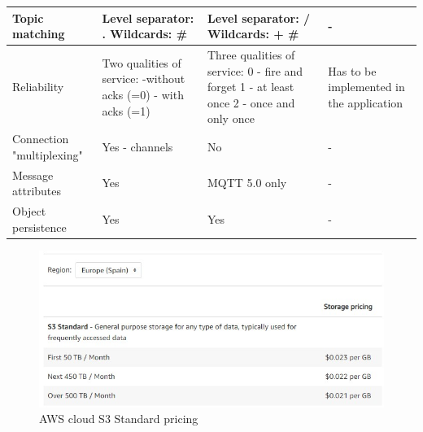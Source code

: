 \begin{table}[htbp]
\begin{center}
\begin{tabular}{|p{3cm}|p{4.5cm}|p{4.5cm}|p{4.5cm}|}
    \hline
    Topic matching & Level separator: . Wildcards: \* \# & Level separator: / Wildcards: + \# & - \\
    \hline
    Reliability & Two qualities of service: -without acks (=0) - with acks (=1) & Three qualities of service: 0 - fire and forget 1 - at least once 2 - once and only once & Has to be implemented in the application\\
    \hline
    Connection "multiplexing" & Yes - channels & No & -\\
    \hline
    Message attributes & Yes & MQTT 5.0 only & -\\
    \hline
    Object persistence & Yes & Yes & -\\
    \hline
    \end{tabular}
    \label{edge-cloud protocols}
    \end{center}
\end{table}

\begin{figure}[!ht]
    \centering
    \includegraphics[width=15cm]{images/AWSpricing.jpg}
    \caption{AWS cloud S3 Standard pricing}
    \label{fig:AWS pricing}
\end{figure}